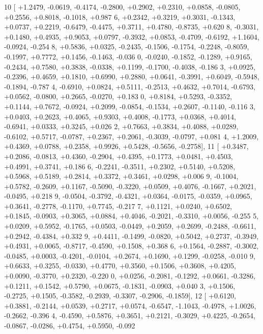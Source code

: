 \begin{DoxyCode}
10 [ +1.2479, -0.0619, -0.4174, -0.2800, +0.2902, +0.2310, +0.0858, -0.0805, +0.2556, +0.8018, -0.1018, +0.987
      6, +0.2342, +0.3219, +0.3031, -0.1343, +0.0737, +0.2219, -0.6479, -0.4475, +0.3711, +0.4780, -0.8735, +0.620
      8, -0.3031, +0.1480, +0.4935, +0.9053, +0.0797, -0.3932, +0.0853, -0.4709, -0.6192, +1.1604, -0.0924, -0.254
      8, +0.5836, +0.0325, -0.2435, -0.1506, -0.1754, -0.2248, -0.8059, -0.1997, +0.7772, +0.1456, -0.1463, -0.036
      0, -0.0240, -0.1852, -0.1289, +0.9165, -0.2434, +0.7580, +0.3838, -0.0338, +0.1199, -0.1700, -0.4038, -0.186
      3, +0.0925, -0.2396, +0.4659, +0.1810, +0.6990, +0.2880, +0.0641, -0.3991, +0.6049, -0.5948, -0.1894, -0.787
      4, -0.6910, +0.0824, +0.5111, -0.2513, +0.4632, +0.7014, -0.6793, +0.0562, -0.0800, +0.2665, -0.0270, +0.183
      0, +0.8184, +0.5293, -0.3352, +0.1144, +0.7672, -0.0924, +0.2099, -0.0854, -0.1534, +0.2607, -0.1140, -0.116
      3, +0.0403, +0.2623, +0.4065, +0.9303, +0.4008, -0.1773, +0.0368, +0.4014, -0.6941, +0.0333, +0.3245, +0.026
      2, +0.7663, +0.3834, +0.4088, +0.0289, -0.6102, +0.5717, -0.0787, +0.2367, +0.2061, -0.3039, -0.0797, +0.081
      4, +1.2009, +0.4369, +0.0788, +0.2358, +0.9926, +0.5428, -0.5656, -0.2758],
11 [ +0.3487, +0.2086, -0.0813, +0.4360, -0.2904, +0.4395, +0.1773, +0.0481, +0.4503, +0.4991, +0.3741, +0.186
      6, -0.2241, -0.3511, +0.2302, +0.5140, +0.5208, +0.5968, +0.5189, +0.2814, +0.3372, +0.3461, +0.0298, +0.006
      9, -0.1004, +0.5782, -0.2609, +0.1167, -0.5090, -0.3220, +0.0509, +0.4076, -0.1667, +0.2021, -0.0495, +0.218
      9, -0.0504, -0.3792, -0.4321, +0.0364, -0.0175, -0.0359, +0.0965, +0.3641, -0.2778, -0.1170, +0.7745, -0.217
      7, +0.1121, +0.0240, +0.6502, +0.1845, -0.0903, +0.3065, +0.0884, +0.4046, -0.2021, -0.3310, +0.0056, -0.255
      5, +0.0209, +0.5952, -0.1765, +0.0503, -0.0449, +0.2059, +0.2699, -0.2488, -0.6611, +0.2942, -0.4384, +0.332
      9, +0.4411, -0.1499, -0.0820, +0.5042, +0.2737, -0.3949, +0.4931, +0.0065, -0.8717, -0.4590, +0.1508, +0.368
      6, +0.1564, -0.2887, -0.3002, -0.0485, +0.0003, -0.4201, -0.0104, +0.2674, +0.1690, +0.1299, -0.0258, -0.010
      9, +0.6633, +0.3255, -0.0330, +0.4770, +0.3560, +0.1506, +0.3608, +0.4205, +0.0090, -0.3770, +0.2320, -0.220
      0, +0.0256, -0.2081, -0.1292, +0.0661, -0.3286, +0.1211, +0.1542, +0.5790, +0.0675, -0.1831, -0.0903, +0.040
      3, +0.1506, -0.2725, +0.1505, -0.3582, -0.2939, -0.3307, -0.2906, -0.1859],
12 [ +0.6120, +0.3881, -0.2144, +0.0539, +0.2717, +0.0574, -0.6547, -1.1043, -0.4978, +1.0026, -0.2662, -0.396
      4, -0.4590, +0.5876, +0.3651, +0.2121, -0.3029, +0.4225, -0.2654, -0.0867, -0.0286, +0.4754, +0.5950, -0.092

\end{DoxyCode}
